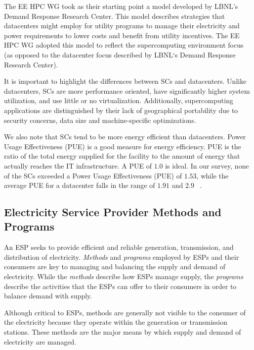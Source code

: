 The EE HPC WG took as their starting point a
model developed by LBNL's Demand Response Research
Center. This model describes strategies that datacenters might employ for utility programs to manage their electricity and
power requirements to lower costs and benefit from utility
incentives. The EE HPC WG adopted this model %
to reflect the supercomputing environment
focus (as opposed to %
the datacenter focus described by LBNL`s Demand
Response Research Center).

It is important to highlight the differences between SCs and datacenters. Unlike datacenters, SCs are more performance oriented, have significantly higher system utilization, and use little or no virtualization. 
Additionally, supercomputing
applications are distinguished by their lack of geographical
portability due to security concerns, data size and machine-specific
optimizations.  

We also note that SCs tend to be more
energy efficient than datacenters. Power Usage Effectiveness (PUE) is a good measure for energy efficiency. PUE is the ratio of the total energy supplied for the facility to the amount of energy that actually reaches the IT infrastructure. A PUE of $1.0$ is ideal. In our survey, none of the SCs exceeded a Power Usage Effectiveness (PUE) of $1.53$, while the average PUE for a datacenter falls in the range of $1.91$ and $2.9$ ~\cite{Niccolai}.

\subsection{Electricity Service Provider Methods and \\Programs}
\label{sub:EPP}
An ESP seeks to provide efficient and reliable generation, transmission, and 
distribution of electricity. \emph{Methods} and \emph{programs} employed by ESPs and their consumers 
are key to managing and balancing the supply and demand of electricity. While the \textit{methods} 
describe how ESPs manage supply, the \textit{programs} describe the activities that 
the ESPs can offer to their consumers in order to balance demand with supply.

Although critical to ESPs, methods are generally not visible to the consumer of the electricity because they
operate within the generation or transmission stations. These methods are the major means by which supply and demand of electricity are managed.


